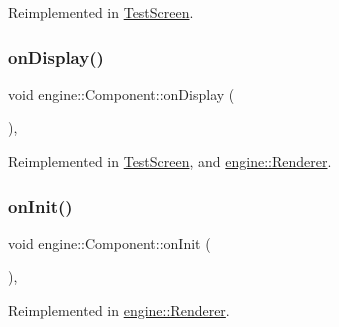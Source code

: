 Reimplemented in \mbox{\hyperlink{class_test_screen_a4a1ec22e2510e846790c4ad6a33906ad}{Test\+Screen}}.

\mbox{\label{classengine_1_1_component_a86a7778d8754130072dbea2b1901728e}} 
\subsubsection{\texorpdfstring{on\+Display()}{onDisplay()}}
{\footnotesize\ttfamily void engine\+::\+Component\+::on\+Display (\begin{DoxyParamCaption}{ }\end{DoxyParamCaption})\hspace{0.3cm}{\ttfamily [private]}, {\ttfamily [virtual]}}



Reimplemented in \mbox{\hyperlink{class_test_screen_a3ea48247e6a1db6d6f2e703b5d433f35}{Test\+Screen}}, and \mbox{\hyperlink{classengine_1_1_renderer_a13048cedb5c2f7d9f28dbb43b69ddea8}{engine\+::\+Renderer}}.

\mbox{\label{classengine_1_1_component_aeab591561127143769e9c4f004f85652}} 
\subsubsection{\texorpdfstring{on\+Init()}{onInit()}}
{\footnotesize\ttfamily void engine\+::\+Component\+::on\+Init (\begin{DoxyParamCaption}{ }\end{DoxyParamCaption})\hspace{0.3cm}{\ttfamily [private]}, {\ttfamily [virtual]}}



Reimplemented in \mbox{\hyperlink{classengine_1_1_renderer_a566c0e1bc3835f37bf18922d13901524}{engine\+::\+Renderer}}.

\mbox{\label{classengine_1_1_component_a3b256388549dbdeead09ebe7bd3ca0e6}} 
